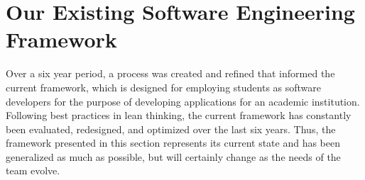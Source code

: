 \section{Our Existing Software Engineering Framework}


Over a six year period, a process was created and refined that informed the current framework, which is designed for employing students as software developers for the purpose of developing applications for an academic institution. Following best practices in lean thinking, the current framework has constantly been evaluated, redesigned, and optimized over the last six years. Thus, the framework presented in this section represents its current state and has been generalized as much as possible, but will certainly change as the needs of the team evolve.

